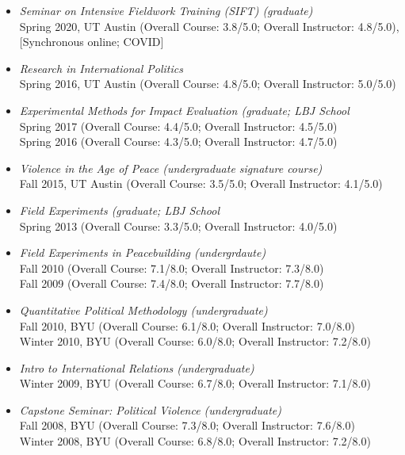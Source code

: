 \documentclass[10pt]{article}
\begin{document}
\begin{itemize}
\item \textit{Seminar on Intensive Fieldwork Training (SIFT) (graduate)}
\\ \indent Spring 2020, UT Austin (Overall Course: 3.8/5.0; Overall Instructor: 4.8/5.0), [Synchronous online; COVID]

\item \textit{Research in International Politics}
\\ \indent Spring 2016, UT Austin (Overall Course: 4.8/5.0; Overall Instructor: 5.0/5.0)

\item \textit{Experimental Methods for Impact Evaluation (graduate; LBJ School}
\\ \indent Spring 2017 (Overall Course: 4.4/5.0; Overall Instructor: 4.5/5.0)
\\ \indent Spring 2016 (Overall Course: 4.3/5.0; Overall Instructor: 4.7/5.0)

\item \textit{Violence in the Age of Peace (undergraduate signature course)}
\\ \indent Fall 2015, UT Austin (Overall Course: 3.5/5.0; Overall Instructor: 4.1/5.0)


\item \textit{Field Experiments (graduate; LBJ School}
\\ \indent Spring 2013 (Overall Course: 3.3/5.0; Overall Instructor: 4.0/5.0)

\item \textit{Field Experiments in Peacebuilding (undergrdaute)}
\\ \indent Fall 2010 (Overall Course: 7.1/8.0; Overall Instructor: 7.3/8.0)
\\ \indent Fall 2009 (Overall Course: 7.4/8.0; Overall Instructor: 7.7/8.0) 

\item \textit{Quantitative Political Methodology (undergraduate)}
\\ \indent Fall 2010, BYU (Overall Course: 6.1/8.0; Overall Instructor: 7.0/8.0)
\\ \indent Winter 2010, BYU (Overall Course: 6.0/8.0; Overall Instructor: 7.2/8.0) 

\item \textit{Intro to International Relations (undergraduate)}
\\ \indent Winter 2009, BYU  (Overall Course: 6.7/8.0; Overall Instructor: 7.1/8.0) 

\item \textit{Capstone Seminar: Political Violence (undergraduate)}
\\ \indent Fall 2008, BYU (Overall Course: 7.3/8.0; Overall Instructor: 7.6/8.0)
\\ \indent Winter 2008, BYU (Overall Course: 6.8/8.0; Overall Instructor: 7.2/8.0)

\end{itemize}
\end{document}
